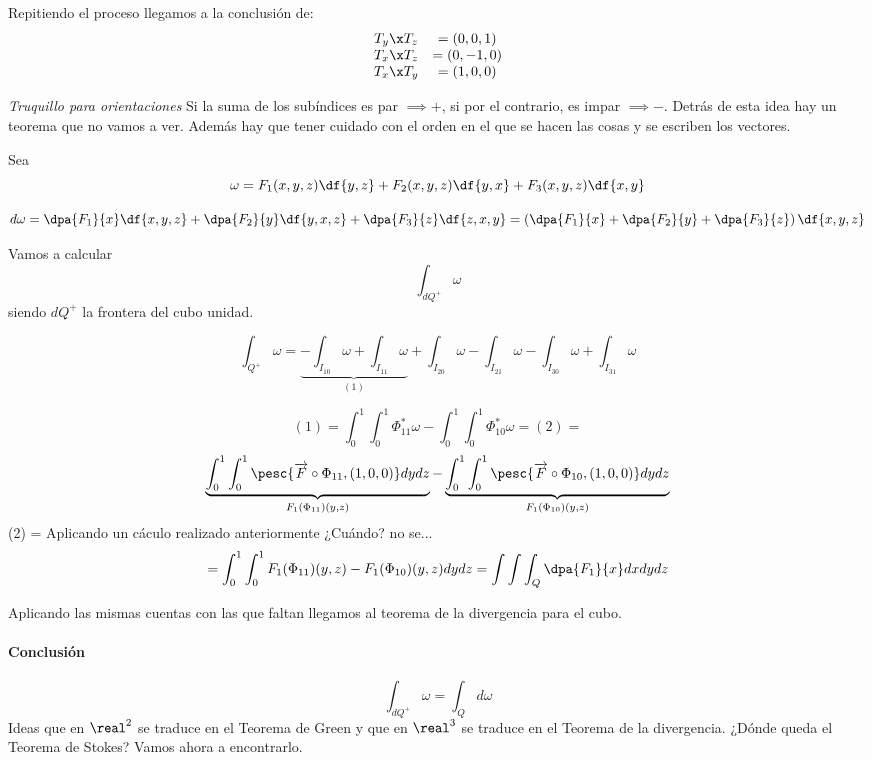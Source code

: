 Repitiendo el proceso llegamos a la conclusión de: \[
\begin{array}{cc}
T_y\x T_z &= (0,0,1)\\
T_x\x T_z &= (0,-1,0)\\
T_x\x T_y &= (1,0,0)
\end{array}\]

\textit{Truquillo para orientaciones} Si la suma de los subíndices es par $\implies +$, si por el contrario, es impar $\implies -$. Detrás de esta idea hay un teorema que no vamos a ver. Además hay que tener cuidado con el orden en el que se hacen las cosas y se escriben los vectores.

Sea
\[\omega = F_1(x,y,z)\df{y,z}+F_2(x,y,z)\df{y,x}+F_3(x,y,z)\df{x,y}\]
 
\[d\omega = \dpa{F_1}{x}\df{x,y,z} + \dpa{F_2}{y}\df{y,x,z} + \dpa{F_3}{z}\df{z,x,y} = \left(\dpa{F_1}{x}+\dpa{F_2}{y} + \dpa{F_3}{z}\right) \df{x,y,z}
\]

Vamos a calcular \[\int_{dQ^+} \omega\] siendo $dQ^+$ la frontera del cubo unidad.

\[\int_{Q^+} \omega =\underbrace{ -\int_{I_{10}} \omega +  \int_{I_{11}} \omega}_{(1)} + \int_{I_{20}} \omega -  \int_{I_{21}} \omega  -\int_{I_{30}} \omega +  \int_{I_{31}} \omega\]

\[
(1) = \int_0^1\int_0^1\Phi^{\ast}_{11}\omega - \int_0^1\int_0^1 \Phi^{\ast}_{10} \omega = (2) =\]
\[
 \underbrace{\int_0^1\int_0^1 \pesc{\overrightarrow{F}\circ \Phi_{11},(1,0,0)}dydz}_{F_1(\Phi_{11})(y,z)}
 - \underbrace{ \int_0^1\int_0^1 \pesc{\overrightarrow{F}\circ \Phi_{10},(1,0,0)}dydz}_{F_1(\Phi_{10})(y,z)}
\]
(2) = Aplicando un cáculo realizado anteriormente ¿Cuándo? no se...
\[
= \int_0^1\int_0^1 F_1(\Phi_{11})(y,z)-F_1(\Phi_{10})(y,z)dydz = \int\int\int_Q \dpa{F_1}{x}dxdydz
\]

Aplicando las mismas cuentas con las que faltan llegamos al teorema de la divergencia para el cubo.


\paragraph{Conclusión}
\[\int_{dQ^+} \omega = \int_{Q}d\omega\]
Ideas que en $\real^2$ se traduce en el Teorema de Green y que en $\real^3$ se traduce en el Teorema de la divergencia. ¿Dónde queda el Teorema de Stokes? Vamos ahora a encontrarlo.


